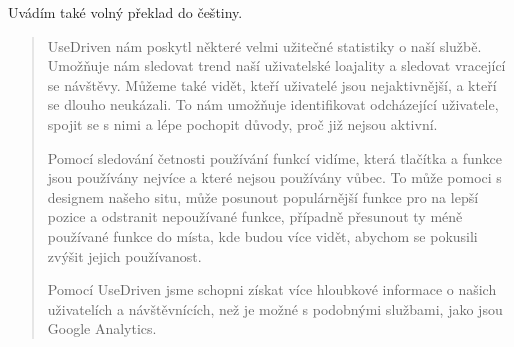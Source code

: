 \documentclass[bc,male,java,dept456]{diploma}						%
\begin{document}
Uvádím také volný překlad do češtiny.

\begin{quote}
UseDriven nám poskytl některé velmi užitečné statistiky o naší službě. U\-mo\-žňu\-je nám sledovat trend naší uživatelské loajality a sledovat vracející se návštěvy. Můžeme také vidět, kteří uživatelé jsou nejaktivnější, a kteří se dlouho neukázali. To nám umožňuje identifikovat odcházející uživatele, spojit se s nimi a lépe pochopit důvody, proč již nejsou aktivní.

Pomocí sledování četnosti používání funkcí vidíme, která tlačítka a funkce jsou používány nejvíce a které nejsou používány vůbec. To může pomoci s designem našeho situ, může posunout populárnější funkce pro na lepší pozice a odstranit nepoužívané funkce, případně přesunout ty méně používané funkce do místa, kde budou více vidět, abychom se pokusili zvýšit jejich používanost.

Pomocí UseDriven jsme schopni získat více hloubkové informace o našich uživatelích a návštěvnících, než je možné s podobnými službami, jako jsou Google Analytics.
\end{quote}

\end{document}
